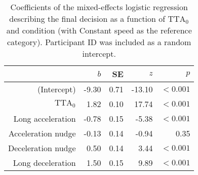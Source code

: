 \begin{table}[h]
\centering
\caption{Coefficients of the mixed-effects logistic regression describing the final decision as a function of $\textrm{TTA}_0$ and condition (with Constant speed as the reference category). Participant ID was included as a random intercept.}
\label{tab:decision}
\begin{tabular}{rrrrr}
\toprule
 & $b$ & SE & $z$ & $p$ \\
\midrule
(Intercept) & -9.30 & 0.71 & -13.10 & $<0.001$ \\
$\textrm{TTA}_0$ & 1.82 & 0.10 & 17.74 & $<0.001$ \\
Long acceleration & -0.78 & 0.15 & -5.38 & $<0.001$ \\
Acceleration nudge & -0.13 & 0.14 & -0.94 & 0.35 \\
Deceleration nudge & 0.50 & 0.14 & 3.44 & $<0.001$ \\
Long deceleration & 1.50 & 0.15 & 9.89 & $<0.001$ \\
\bottomrule
\end{tabular}
\end{table}
